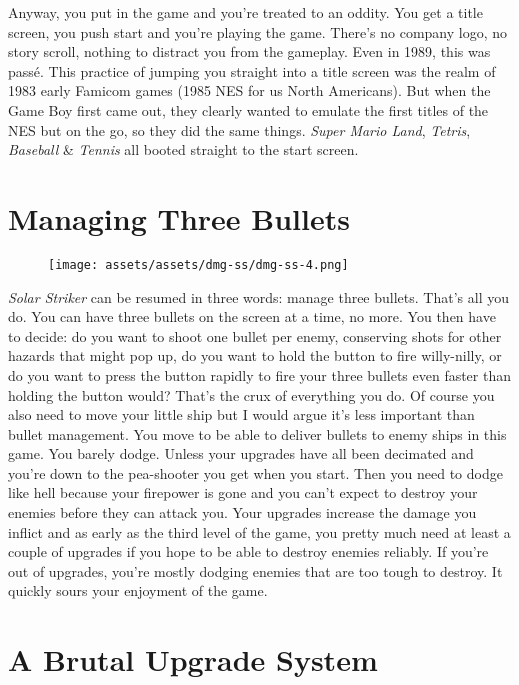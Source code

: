 \documentclass{book}
\begin{document}
Anyway, you put in the game and you’re treated to an oddity. You get a title screen, you push start and you’re playing the game. There’s no company logo, no story scroll, nothing to distract you from the gameplay. Even in 1989, this was passé. This practice of jumping you straight into a title screen was the realm of 1983 early Famicom games (1985 NES for us North Americans). But when the Game Boy first came out, they clearly wanted to emulate the first titles of the NES but on the go, so they did the same things. \emph{Super Mario Land}, \emph{Tetris}, \emph{Baseball} \& \emph{Tennis} all booted straight to the start screen.

\FloatBarrier\needspace{10mm}\section*{Managing Three Bullets}\nopagebreak[4]

\begin{figure}[hbt]
\vskip 10pt
\centering \texttt{[image: assets/assets/dmg-ss/dmg-ss-4.png]}
\vskip 6pt
\end{figure}
\emph{Solar Striker} can be resumed in three words: manage three bullets. That’s all you do. You can have three bullets on the screen at a time, no more. You then have to decide: do you want to shoot one bullet per enemy, conserving shots for other hazards that might pop up, do you want to hold the button to fire willy-nilly, or do you want to press the button rapidly to fire your three bullets even faster than holding the button would? That’s the crux of everything you do. Of course you also need to move your little ship but I would argue it’s less important than bullet management. You move to be able to deliver bullets to enemy ships in this game. You barely dodge. Unless your upgrades have all been decimated and you’re down to the pea-shooter you get when you start. Then you need to dodge like hell because your firepower is gone and you can’t expect to destroy your enemies before they can attack you. Your upgrades increase the damage you inflict and as early as the third level of the game, you pretty much need at least a couple of upgrades if you hope to be able to destroy enemies reliably. If you’re out of upgrades, you’re mostly dodging enemies that are too tough to destroy. It quickly sours your enjoyment of the game.

\FloatBarrier\needspace{10mm}\section*{A Brutal Upgrade System}\nopagebreak[4]
\end{document}

